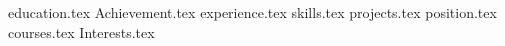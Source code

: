 \documentclass[11pt, a4paper]{awesome-cv}
\newcommand*{\sectiondir}{resume/}
\begin{document}
\makecvheader

{education.tex}
{Achievement.tex}
{experience.tex}
{skills.tex}
{projects.tex}
{position.tex}
{courses.tex}
{Interests.tex}
\end{document}
